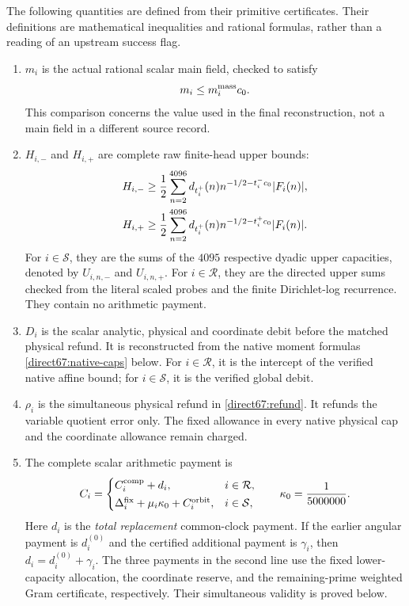 \documentclass[11pt,a4paper]{article}
\theoremstyle{definition}
\theoremstyle{remark}
\begin{document}
The following quantities are defined from their primitive certificates.
Their definitions are mathematical inequalities and rational formulas,
rather than a reading of an upstream success flag.
\begin{enumerate}[label=(\roman*)]
\item
$m_i$ is the actual rational scalar main field, checked to satisfy
\begin{equation}
 m_i\le m_i^{\rm mass}c_0.
 \label{direct67:main}
\end{equation}
This comparison concerns the value used in the final reconstruction,
not a main field in a different source record.

\item
$H_{i,-}$ and $H_{i,+}$ are complete raw finite-head upper bounds:
\begin{align}
 H_{i,-}&\ge\frac12\sum_{n=2}^{4096}
 d_{t_i^+}(n)n^{-1/2-t_i^-c_0}|F_i(n)|,\notag\\
 H_{i,+}&\ge\frac12\sum_{n=2}^{4096}
 d_{t_i^+}(n)n^{-1/2-t_i^+c_0}|F_i(n)|.
 \label{direct67:raw-heads}
\end{align}
For $i\in\mathcal S$, they are the sums of the $4095$ respective
dyadic upper capacities, denoted by $U_{i,n,-}$ and $U_{i,n,+}$.
For $i\in\mathcal R$, they are the directed
upper sums checked from the literal scaled probes and the finite
Dirichlet-log recurrence.  They contain no arithmetic payment.

\item
$D_i$ is the scalar analytic, physical and coordinate debit before the
matched physical refund.  It is reconstructed from the native moment
formulas \eqref{direct67:native-caps} below.  For $i\in\mathcal R$,
it is the intercept of the verified native affine bound; for
$i\in\mathcal S$, it is the verified global debit.

\item
$\rho_i$ is the simultaneous physical refund in
\eqref{direct67:refund}.  It refunds the variable quotient error only.
The fixed allowance in every native physical cap and the coordinate
allowance remain charged.

\item
The complete scalar arithmetic payment is
\begin{equation}
 C_i=
 \begin{cases}
 C_i^{\rm comp}+d_i,&i\in\mathcal R,\\[2pt]
 \Delta_i^{\rm fix}+\mu_i\kappa_0+C_i^{\rm orbit},&i\in\mathcal S,
 \end{cases}
 \qquad \kappa_0=\frac1{5000000}.
 \label{direct67:credit}
\end{equation}
Here $d_i$ is the \emph{total replacement} common-clock payment.  If
the earlier angular payment is $d_i^{(0)}$ and the certified additional
payment is $\gamma_i$, then $d_i=d_i^{(0)}+\gamma_i$.
The three payments in the second line use the fixed lower-capacity
allocation, the coordinate reserve, and the remaining-prime weighted
Gram certificate, respectively.  Their simultaneous validity is proved
below.


\end{enumerate}
\end{document}
